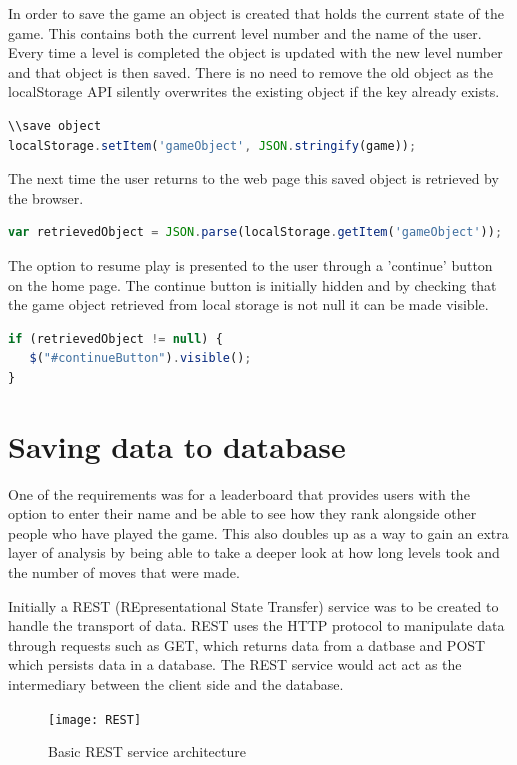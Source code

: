 \documentclass[12pt,a4paper]{report}
\begin{document}
In order to save the game an object is created that holds the current state of the game. This contains both the current level number and the name of the user. Every time a level is completed the object is updated with the new level number and that object is then saved. There is no need to remove the old object as the localStorage API silently overwrites the existing object if the key already exists.


\begin{lstlisting}[language=JavaScript]
\\save object
localStorage.setItem('gameObject', JSON.stringify(game));
\end{lstlisting}

The next time the user returns to the web page this saved object is retrieved by the browser.
\begin{lstlisting}[language=JavaScript]
var retrievedObject = JSON.parse(localStorage.getItem('gameObject'));
\end{lstlisting}

The option to resume play is presented to the user through a 'continue' button on the home page. The continue button is initially hidden and by checking that the game object retrieved from local storage is not null it can be made visible.

\begin{lstlisting}[language=JavaScript]
if (retrievedObject != null) {
   $("#continueButton").visible();
}
\end{lstlisting}

\section{Saving data to database}
One of the requirements was for a leaderboard that provides users with the option to enter their name and be able to see how they rank alongside other people who have played the game. This also doubles up as a way to gain an extra layer of analysis by being able to take a deeper look at how long levels took and the number of moves that were made. 

Initially a REST (REpresentational State Transfer) service was to be created to handle the transport of data. REST uses the HTTP protocol to manipulate data through requests such as GET, which returns data from a datbase and POST which persists data in a database. The REST service would act act as the intermediary between the client side and the database.

\begin{figure}[h]
  \centering
  \begin{minipage}[b]{1\textwidth}
    \texttt{[image: REST]}
    \caption{Basic REST service architecture}
  \end{minipage}
\end{figure}
\FloatBarrier
\end{document}

